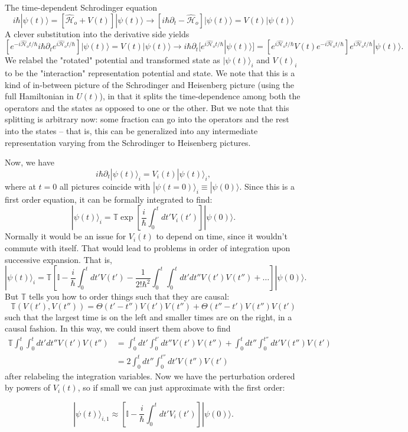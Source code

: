 \documentclass[fontsize=12pt]{scrartcl}
\newcommand{\bb}[1]{\mathbb{#1}}
\newcommand{\Id}{\bb{I}}
\newcommand{\ptl}{\partial}
\newcommand{\ra}{\rangle}
\newcommand{\Ham}{\hat{\mathcal{H}}}
\begin{document}
The time-dependent Schrodinger equation $$i\hbar |\psi(t)\ra = [\Ham_o+V(t)]|\psi(t)\ra \to [i\hbar \ptl_t - \Ham_o]|\psi(t)\ra = V(t)|\psi(t)\ra$$ A clever substitution into the derivative side yields $$\left[e^{-i\Ham_o t/\hbar}i\hbar\ptl_t e^{i\Ham_o t/\hbar}\right]|\psi(t)\ra = V(t)|\psi(t)\ra \to i\hbar \ptl_t [e^{i\Ham_ot/\hbar}|\psi(t)\ra] = [e^{i\Ham_ot/\hbar}V(t)e^{-i\Ham_ot/\hbar}]e^{i\Ham_ot/\hbar}|\psi(t)\ra.$$ We relabel the "rotated" potential and transformed state as $|\psi(t)\ra_i$ and $V(t)_i$ to be the "interaction" representation potential and state. We note that this is a kind of in-between picture of the Schrodinger and Heisenberg picture (using the full Hamiltonian in $U(t)$), in that it splits the time-dependence among both the operators and the states as opposed to one or the other. But we note that this splitting is arbitrary now: some fraction can go into the operators and the rest into the states -- that is, this can be generalized into any intermediate representation varying from the Schrodinger to Heisenberg pictures.

Now, we have $$i\hbar\ptl_t|\psi(t)\ra_i = V_i(t)|\psi(t)\ra_i,$$ where at $t=0$ all pictures coincide with $|\psi(t=0)\ra_i\equiv |\psi(0)\ra.$ Since this is a first order equation, it can be formally integrated to find: $$|\psi(t)\ra_i = \bb{T}\exp\left[\frac{i}{\hbar}\int_0^t dt' V_i(t')\right]
|\psi(0)\ra.$$ Normally it would be an issue for $V_i(t)$ to depend on time, since it wouldn't commute with itself. That would lead to problems in order of integration upon successive expansion. That is, $$|\psi(t)\ra_i = \bb{T}\left[\Id - \frac{i}{\hbar}\int_0^t dt' V(t')-\frac{1}{2!\hbar^2}\int_0^t\int_0^t dt'dt'' V(t')V(t'')+\dots\right]|\psi(0)\ra.$$ But $\bb{T}$ tells you how to order things such that they are causal: $$\bb{T}(V(t'),V(t''))= \Theta(t'-t'')V(t')V(t'')+\Theta(t''-t')V(t'')V(t')$$ such that the largest time is on the left and smaller times are on the right, in a causal fashion. In this way, we could insert them above to find \begin{align*}\bb{T}\int_0^t\int_0^tdt'dt''V(t')V(t'') &= \int_0^tdt'\int_0^{t'}dt'' V(t')V(t'')+\int_0^tdt''\int_0^{t''}dt'V(t'')V(t')\\&=2\int_0^tdt''\int_0^{t''}dt'V(t'')V(t')\end{align*} after relabeling the integration variables. Now we have the perturbation ordered by powers of $V_i(t)$, so if small we can just approximate with the first order: \begin{mdframed} $$|\psi(t)\ra_{i,1}\approx \left[\Id - \frac{i}{\hbar}\int_0^t dt' V_i(t')\right]|\psi(0)\ra.$$ \end{mdframed}
\end{document}
